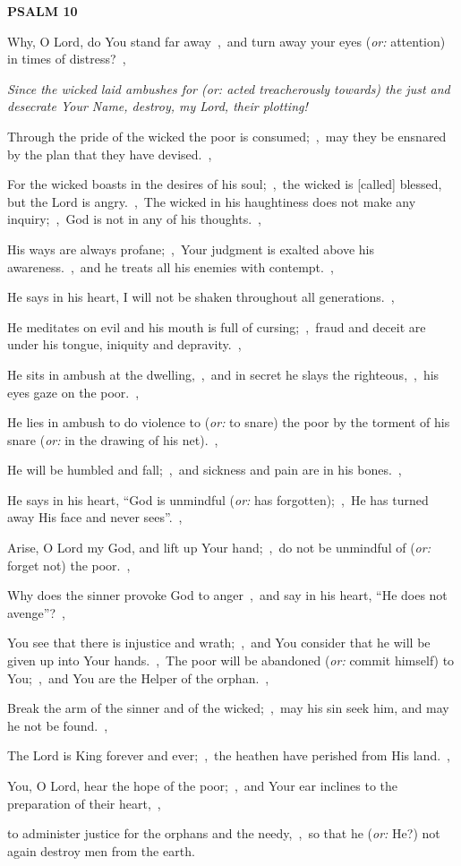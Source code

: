 \documentclass[12pt,twoside,a5paper]{article}
\newcommand{\psalm}[1]{\textbf{PSALM {#1}}\nopagebreak}
\newcommand{\qanona}[1]{{\liturgicalhint{Qanona.} \emph{#1}}}
\newcommand{\translationoption}[1]{\emph{or:} #1}
\begin{document}
\psalm{10}

\begin{normalparskip}
  Why, O Lord, do You stand far away~\sep\ and turn away your eyes (\translationoption{attention}) in times of distress?~\sep

  \qanona{Since the wicked laid ambushes for (\translationoption{acted treacherously towards}) the just and desecrate Your Name, destroy, my Lord, their plotting!}

  Through the pride of the wicked the poor is consumed;~\sep\ may they be ensnared by the plan that they have devised.~\sep

  For the wicked boasts in the desires of his soul;~\sep\ the wicked is [called] blessed, but the Lord is angry.~\sep\ The wicked in his haughtiness does not make any inquiry;~\sep\ God is not in any of his thoughts.~\sep

  His ways are always profane;~\sep\ Your judgment is exalted above his awareness.~\sep\ and he treats all his enemies with contempt.~\sep

  He says in his heart, I will not be shaken throughout all generations.~\sep

  He meditates on evil and his mouth is full of cursing;~\sep\ fraud and deceit are under his tongue, iniquity and depravity.~\sep

  He sits in ambush at the dwelling,~\sep\ and in secret he slays the righteous,~\sep\ his eyes gaze on the poor.~\sep

  He lies in ambush to do violence to (\translationoption{to snare}) the poor by the torment of his snare (\translationoption{in the drawing of his net}).~\sep

  He will be humbled and fall;~\sep\ and sickness and pain are in his bones.~\sep

  He says in his heart, ``God is unmindful (\translationoption{has forgotten});~\sep\ He has turned away His face and never sees''.~\sep

  Arise, O Lord my God, and lift up Your hand;~\sep\ do not be unmindful of (\translationoption{forget not}) the poor.~\sep

  Why does the sinner provoke God to anger~\sep\ and say in his heart, ``He does not avenge''?~\sep

  You see that there is injustice and wrath;~\sep\ and You consider that he will be given up into Your hands.~\sep\ The poor will be abandoned (\translationoption{commit himself}) to You;~\sep\ and You are the Helper of the orphan.~\sep

  Break the arm of the sinner and of the wicked;~\sep\ may his sin seek him, and may he not be found.~\sep

  The Lord is King forever and ever;~\sep\ the heathen have perished from His land.~\sep

  You, O Lord, hear the hope of the poor;~\sep\ and Your ear inclines to the preparation of their heart,~\sep

  to administer justice for the orphans and the needy,~\sep\ so that he (\translationoption{He?}) not again destroy men from the earth.
\end{normalparskip}
\end{document}
